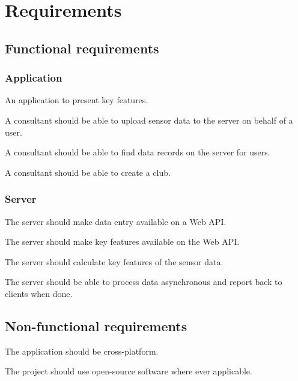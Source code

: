 \chapter{Requirements}

\section*{Functional requirements}

\subsection*{Application}

An application to present key features.

A consultant should be able to upload sensor data to the server on behalf of a user.

A consultant should be able to find data records on the server for users.

A consultant should be able to create a club.

\subsection*{Server}

The server should make data entry available on a Web API.

The server should make key features available on the Web API.

The server should calculate key features of the sensor data.

The server should be able to process data asynchronous and report back to clients when done.

\section*{Non-functional requirements}

The application should be cross-platform.

The project should use open-source software where ever applicable.


